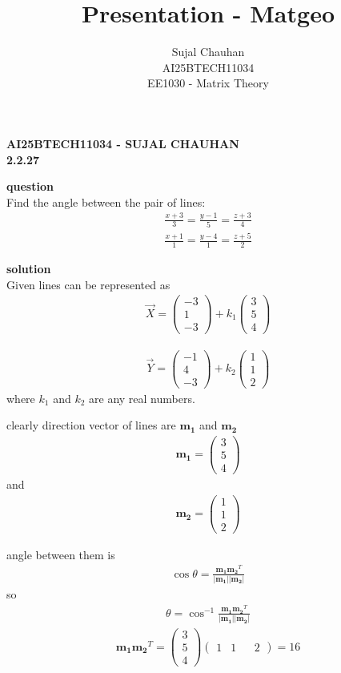 \documentclass{beamer}
\title{Presentation - Matgeo}
\author{ Sujal Chauhan\\
AI25BTECH11034 \\
EE1030 - Matrix Theory}
\theoremstyle{remark}
\newcommand{\myvec}[1]{\ensuremath{\begin{pmatrix}#1\end{pmatrix}}}
\let\vec\mathbf
\numberwithin{equation}{section}
\begin{document}
\begin{frame}
\begin{center}
\textbf{\Large AI25BTECH11034 - SUJAL CHAUHAN }\\
\textbf {2.2.27}
\end{center}

\textbf{question}\\
Find the angle between the pair of lines:\\
\begin{align*}
    \frac{x+3}{3}=\frac{y-1}{5}=\frac{z+3}{4}
\end{align*}
\begin{align*}
    \frac{x+1}{1}=\frac{y-4}{1}=\frac{z+5}{2}
\end{align*}
\end{frame}
\begin{frame}
\textbf{solution}\\
Given lines can be represented as \\
\begin{align}
    \Vec{X}= \myvec{-3 \\ 1 \\-3} + k_1\myvec{3 \\ 5 \\4}    
\end{align}

\begin{align}
    \Vec{Y} = \myvec{-1\\4\\-3} + k_2\myvec{1\\1\\2}
\end{align}
where $k_1$ and $k_2$ are any real numbers.\\
\end{frame}
\begin{frame}
    

clearly direction vector of lines are $\vec{m_1}$ and $\vec{m_2}$
\begin{align}
    \vec{m_1}=\myvec{3\\5\\4} 
\end{align}
and
\begin{align}
     \vec{m_2}=\myvec{1\\1\\2}
\end{align}
\end{frame}
\begin{frame}
angle between them is 
\begin{align}
    \cos{\theta}=\frac{\vec{m_1}\vec{m_2}^T}{|\vec{m_1}||\vec{m_2}|}
\end{align}
so 
\begin{align}
    \theta=\cos^{-1}{\frac{\vec{m_1}\vec{m_2}^T}{|\vec{m_1}||\vec{m_2}|}}
\end{align}
\begin{align}
    \vec{m_1}\vec{m_2}^T=\myvec{3 \\ 5 \\ 4}\myvec{1&1&&2}=16
\end{align}
\end{frame}
\end{document}
